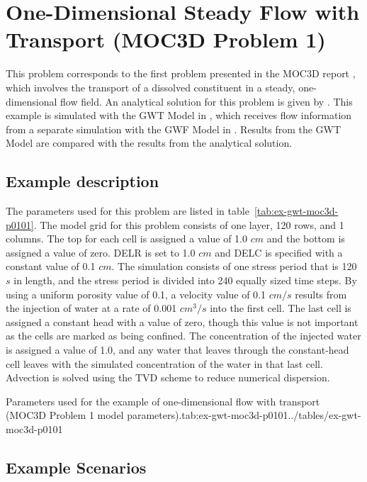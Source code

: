 \section{One-Dimensional Steady Flow with Transport (MOC3D Problem 1)}

This problem corresponds to the first problem presented in the MOC3D report \cite{konikow1996three}, which involves the transport of a dissolved constituent in a steady, one-dimensional flow field.  An analytical solution for this problem is given by \cite{wexler1992}.  This example is simulated with the GWT Model in \mf, which receives flow information from a separate simulation with the GWF Model in \mf.  Results from the GWT Model are compared with the results from the \cite{wexler1992} analytical solution.  

\subsection{Example description}

The parameters used for this problem are listed in table~\ref{tab:ex-gwt-moc3d-p0101}.  The model grid for this problem consists of one layer, 120 rows, and 1 columns.  The top for each cell is assigned a value of 1.0 $cm$ and the bottom is assigned a value of zero.  DELR is set to 1.0 $cm$ and DELC is specified with a constant value of 0.1 $cm$.  The simulation consists of one stress period that is 120 $s$ in length, and the stress period is divided into 240 equally sized time steps.  By using a uniform porosity value of 0.1, a velocity value of 0.1 $cm/s$ results from the injection of water at a rate of 0.001 $cm^3/s$ into the first cell.  The last cell is assigned a constant head with a value of zero, though this value is not important as the cells are marked as being confined.  The concentration of the injected water is assigned a value of 1.0, and any water that leaves through the constant-head cell leaves with the simulated concentration of the water in that last cell.   Advection is solved using the TVD scheme to reduce numerical dispersion.

\begin{StandardTable}{Parameters used for the example of one-dimensional flow with transport (MOC3D Problem 1 model parameters).}{tab:ex-gwt-moc3d-p0101}{../tables/ex-gwt-moc3d-p0101}
\end{StandardTable}

\subsection{Example Scenarios}

